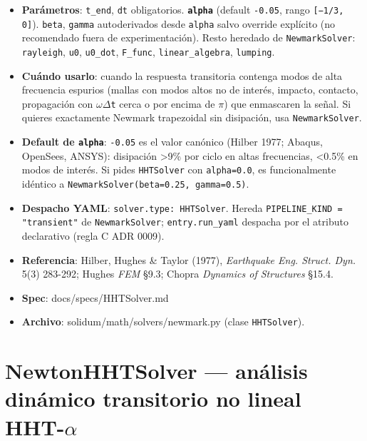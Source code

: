 \documentclass[11pt,letterpaper,oneside]{report}
\begin{document}
\begin{itemize}
  \item \textbf{Parámetros}: \texttt{t\_end}, \texttt{dt} obligatorios. \textbf{\texttt{alpha}} (default \texttt{-0.05}, rango \texttt{[−1/3, 0]}). \texttt{beta}, \texttt{gamma} autoderivados desde \texttt{alpha} salvo override explícito (no recomendado fuera de experimentación). Resto heredado de \texttt{NewmarkSolver}: \texttt{rayleigh}, \texttt{u0}, \texttt{u0\_dot}, \texttt{F\_func}, \texttt{linear\_algebra}, \texttt{lumping}.
  \item \textbf{Cuándo usarlo}: cuando la respuesta transitoria contenga modos de alta frecuencia espurios (mallas con modos altos no de interés, impacto, contacto, propagación con \texttt{\ensuremath{\omega}\ensuremath{\Delta}t} cerca o por encima de \ensuremath{\pi}) que enmascaren la señal. Si quieres exactamente Newmark trapezoidal sin disipación, usa \texttt{NewmarkSolver}.
  \item \textbf{Default de \texttt{alpha}}: \texttt{-0.05} es el valor canónico (Hilber 1977; Abaqus, OpenSees, ANSYS): disipación >9\% por ciclo en altas frecuencias, <0.5\% en modos de interés. Si pides \texttt{HHTSolver} con \texttt{alpha=0.0}, es funcionalmente idéntico a \texttt{NewmarkSolver(beta=0.25, gamma=0.5)}.
  \item \textbf{Despacho YAML}: \texttt{solver.type: HHTSolver}. Hereda \texttt{PIPELINE\_KIND = "transient"} de \texttt{NewmarkSolver}; \texttt{entry.run\_yaml} despacha por el atributo declarativo (regla C ADR 0009).
  \item \textbf{Referencia}: Hilber, Hughes \& Taylor (1977), \textit{Earthquake Eng. Struct. Dyn.} 5(3) 283-292; Hughes \textit{FEM} §9.3; Chopra \textit{Dynamics of Structures} §15.4.
  \item \textbf{Spec}: docs/specs/HHTSolver.md
  \item \textbf{Archivo}: solidum/math/solvers/newmark.py (clase \texttt{HHTSolver}).
\end{itemize}


\section{NewtonHHTSolver --- análisis dinámico transitorio no lineal HHT-\ensuremath{\alpha}}
\end{document}
